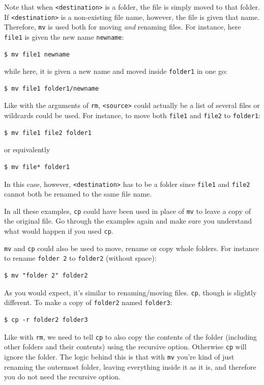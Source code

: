 Note that when \verb|<destination>| is a folder, the file is simply moved to that folder. If \verb|<destination>| is a non-existing file name, however, the file is given that name. Therefore, \verb|mv| is used both for moving \emph{and} renaming files. For instance, here \verb|file1| is given the new name \verb|newname|:

\begin{verbatim}
$ mv file1 newname
\end{verbatim}
while here, it is given a new name and moved inside \verb|folder1| in one go:

\begin{verbatim}
$ mv file1 folder1/newname
\end{verbatim}

Like with the arguments of \verb|rm|, \verb|<source>| could actually be a list of several files or wildcards could be used. For instance, to move both \verb|file1| and \verb|file2| to \verb|folder1|:

\begin{verbatim}
$ mv file1 file2 folder1
\end{verbatim}
or equivalently
\begin{verbatim}
$ mv file* folder1
\end{verbatim}
In this case, however, \verb|<destination>| has to be a folder since \verb|file1| and \verb|file2| cannot both be renamed to the same file name. 

In all these examples, \verb|cp| could have been used in place of \verb|mv| to leave a copy of the original file. Go through the examples again and make sure you understand what would happen if you used \verb|cp|.

\verb|mv| and \verb|cp| could also be used to move, rename or copy whole folders. For instance to rename \verb|folder 2| to \verb|folder2| (without space):

\begin{verbatim}
$ mv "folder 2" folder2
\end{verbatim}
As you would expect, it's similar to renaming/moving files. \verb|cp|, though is slightly different. To make a copy of \verb|folder2| named \verb|folder3|:

\begin{verbatim}
$ cp -r folder2 folder3
\end{verbatim}
Like with \verb|rm|, we need to tell \verb|cp| to also copy the contents of the folder (including other folders and their contents) using the recursive option. Otherwise \verb|cp| will ignore the folder. The logic behind this is that with \verb|mv| you're kind of just renaming the outermost folder, leaving everything inside it as it is, and therefore you do not need the recursive option.

